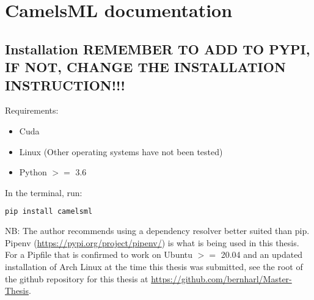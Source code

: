 \section{CamelsML documentation}
\label{camelsml documentation}
\subsection{Installation REMEMBER TO ADD TO PYPI, IF NOT, CHANGE THE INSTALLATION INSTRUCTION!!!}
Requirements:
\begin{itemize}
    \item Cuda
    \item Linux (Other operating systems have not been tested)
    \item Python $>=$ 3.6
\end{itemize}
In the terminal, run:
\begin{lstlisting}[language=bash]
pip install camelsml
\end{lstlisting}
NB: The author recommends using a dependency resolver better suited than pip. 
Pipenv (\url{https://pypi.org/project/pipenv/}) is what is being used in this thesis.
For a Pipfile that is confirmed to work on Ubuntu $>=$ 20.04 and an updated installation of Arch Linux at the time this thesis was submitted, 
see the root of the github repository for this thesis at \url{https://github.com/bernharl/Master-Thesis}.
